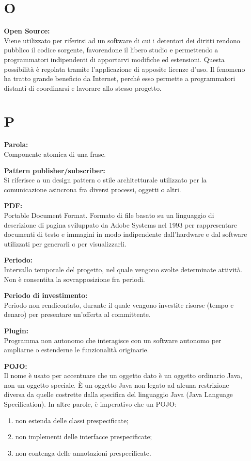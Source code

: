\documentclass[a4paper, oneside, openany, dvipsnames, table]{article}
\begin{document}
\newpage
\section{O}
\textbf{Open Source:}\\	Viene utilizzato per riferirsi ad un software di cui i detentori dei diritti rendono pubblico il codice sorgente, favorendone il libero studio e permettendo a programmatori indipendenti di apportarvi modifiche ed estensioni. Questa possibilità è regolata tramite l'applicazione di apposite licenze d'uso. Il fenomeno ha tratto grande beneficio da Internet, perché esso permette a programmatori distanti di coordinarsi e lavorare allo stesso progetto.

\newpage
\section{P}
\label{par:parola}
\textbf{Parola:}\\	Componente atomica di una frase.

\textbf{Pattern publisher/subscriber:}\\	 Si riferisce a un design pattern o stile architetturale utilizzato per la comunicazione asincrona fra diversi processi, oggetti o altri.

\textbf{PDF:}\\	Portable Document Format. Formato di file basato su un linguaggio di descrizione di pagina sviluppato da Adobe Systems nel 1993 per rappresentare documenti di testo e immagini in modo indipendente dall'hardware e dal software utilizzati per generarli o per visualizzarli.

\textbf{Periodo:}\\	Intervallo temporale del progetto, nel quale vengono svolte determinate attività. Non è consentita la sovrapposizione fra periodi.

\textbf{Periodo di investimento:}\\	Periodo non rendicontato, durante il quale vengono investite risorse (tempo e denaro) per presentare un'offerta al committente.

\textbf{Plugin:}\\	Programma non autonomo che interagisce con un software autonomo per ampliarne o estenderne le funzionalità originarie.

\textbf{POJO:}\\	Il nome è usato per accentuare che un oggetto dato è un oggetto ordinario Java, non un oggetto speciale. \`E un oggetto Java non legato ad alcuna restrizione diversa da quelle costrette dalla specifica del linguaggio Java (Java Language Specification). In altre parole, è imperativo che un POJO:
\begin{enumerate}
\item non estenda delle classi prespecificate;
\item non implementi delle interfacce prespecificate;
\item non contenga delle annotazioni prespecificate.
\end{enumerate}
\end{document}
